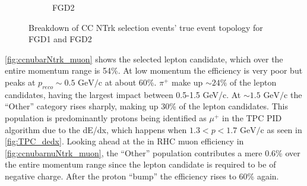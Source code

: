 \begin{figure}[!h]
\begin{subfigure}[t]{0.49\textwidth}
		\caption{FGD2}
	\end{subfigure}
	\caption{Breakdown of \numubar CC NTrk selection events' true event topology for FGD1 and FGD2 }
	\label{fig:ccnubarNtrk_topology}
\end{figure}

\autoref{fig:ccnubarNtrk_muon} shows the selected lepton candidate, which over the entire momentum range is 54\%. At low momentum the efficiency is very poor but peaks at $p_{reco} \sim 0.5 \text{ GeV/c}$ at about 60\%. $\pi^+$ make up $\sim24\%$ of the lepton candidates, having the largest impact between 0.5-1.5 GeV/c. At $\sim 1.5\text{ GeV/c}$ the ``Other'' category rises sharply, making up 30\% of the lepton candidates. This population is predominantly protons being identified as $\mu^+$ in the TPC PID algorithm due to the dE/dx, which happens when $1.3 < p < 1.7 \text{ GeV/c}$ as seen in \autoref{fig:TPC_dedx}. Looking ahead at the \numu in RHC muon efficiency in \autoref{fig:ccnubarnuNtrk_muon}, the ``Other'' population contributes a mere 0.6\% over the entire momentum range since the lepton candidate is required to be of negative charge. After the proton ``bump'' the efficiency rises to 60\% again.
